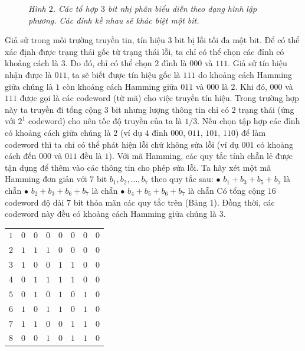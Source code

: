 \begin{multicols}{2}
\begin{figure}[H]
\begin{tikzpicture}[toanhocdoisong,scale=0.85]
		\end{tikzpicture}
		\caption{\small\textit{\color{toanhocdoisong}Hình $2$. Các tổ hợp $3$ bit nhị phân biểu diễn theo dạng hình lập phương. Các đỉnh kề nhau sẽ khác biệt một bit.}}
		\vspace*{-10pt}
	\end{figure}
	Giả sử trong môi trường truyền tin, tín hiệu $3$ bit bị lỗi tối đa một bit. Để có thể xác định được trạng thái gốc từ trạng thái lỗi, ta chỉ có thể chọn các đỉnh có khoảng cách là $3$. Do đó, chỉ có thể chọn $2$ đỉnh là $000$ và $111$. Giả sử tín hiệu nhận được là $011$, ta sẽ biết được tín hiệu gốc là $111$ do khoảng cách Hamming giữa chúng là $1$ còn khoảng cách Hamming giữa $011$ và $000$ là $2$. Khi đó, $000$ và $111$ được gọi là các codeword (từ mã) cho việc truyền tín hiệu. Trong trường hợp này ta truyền đi tổng cộng $3$ bit nhưng lượng thông tin chỉ có $2$ trạng thái (ứng với $2^1$ codeword) cho nên tốc độ truyền của ta là $1/3$. Nếu chọn tập hợp các đỉnh có khoảng cách giữa chúng là $2$ (ví dụ $4$ đỉnh $000$, $011$, $101$, $110$) để làm codeword thì ta chỉ có thể phát hiện lỗi chứ không sửa lỗi (ví dụ $001$ có khoảng cách đến $000$ và $011$ đều là $1$).
	\vskip 0.1cm 
	Với mã Hamming, các quy tắc tính chẵn lẻ được tận dụng để thêm vào các thông tin cho phép sửa lỗi. Ta hãy xét một mã Hamming đơn giản với $7$ bit $b_1,b_2,\ldots,b_7$ theo quy tắc sau:
	\vskip 0.1cm
	$\bullet$ $b_1+b_3+b_5+b_7$ là chẵn
	\vskip 0.1cm
	$\bullet$ $b_2+b_3+b_6+b_7$ là chẵn
	\vskip 0.1cm
	$\bullet$ $b_4+b_5+b_6+b_7$ là chẵn
	\vskip 0.1cm
	Có tổng cộng $16$ codeword độ dài $7$ bit thỏa mãn các quy tắc trên (Bảng $1$). Đồng thời, các codeword này đều có khoảng cách Hamming giữa chúng là $3$.
	\begin{table}[H]
		\vspace*{-5pt}
		\centering
		\captionsetup{labelformat= empty, justification=centering}
		\begin{tabular}{c c c c c c c c}
			\hline
			$1$ &$0$&$0$&$0$&$0$&$0$&$0$&$0$\\
			$2$ &$1$&$1$&$1$&$0$&$0$&$0$&$0$\\
			$3$ &$1$&$0$&$0$&$1$&$1$&$0$&$0$\\
			$4$ &$0$&$1$&$1$&$1$&$1$&$0$&$0$\\
			$5$ &$0$&$1$&$0$&$1$&$0$&$1$&$0$\\
			$6$ &$1$&$0$&$1$&$1$&$0$&$1$&$0$\\
			$7$ &$1$&$1$&$0$&$0$&$1$&$1$&$0$\\
			$8$ &$0$&$0$&$1$&$0$&$1$&$1$&$0$\\

\end{tabular}
\end{table}
\end{multicols}
